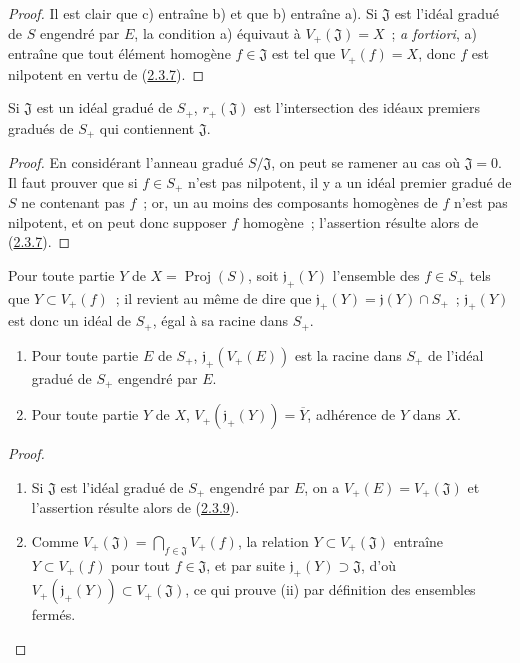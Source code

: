 \begin{proof}
Il est clair que c) entraîne b) et que b) entraîne a). Si $\mathfrak{J}$ est
l'idéal gradué de $S$ engendré par $E$, la condition a) équivaut à
$V_+(\mathfrak{J})=X$~; \emph{a fortiori}, a) entraîne que tout élément
homogène $f\in\mathfrak{J}$ est tel que $V_+(f)=X$, donc $f$ est nilpotent
en vertu de (\hyperref[II.2.3.7-fr]{2.3.7}).
\end{proof}

\begin{corollary}[2.3.9]
\label{II.2.3.9-fr}
Si $\mathfrak{J}$ est un idéal gradué de $S_+$,
$r_+(\mathfrak{J})$ est l'intersection des idéaux premiers gradués de
$S_+$ qui contiennent $\mathfrak{J}$.
\end{corollary}

\begin{proof}
En considérant l'anneau gradué $S/\mathfrak{J}$, on peut se ramener au cas
où $\mathfrak{J}=0$. Il faut prouver que si $f\in S_+$ n'est pas
nilpotent, il y a un idéal premier gradué de $S$ ne contenant pas $f$~; or,
un au moins des composants homogènes de $f$ n'est pas nilpotent, et on peut
donc supposer $f$ homogène~; l'assertion résulte alors de
(\hyperref[II.2.3.7-fr]{2.3.7}).
\end{proof}

\begin{env}[2.3.10]
\label{II.2.3.10-fr}
Pour toute partie $Y$ de $X=\operatorname{Proj}(S)$, soit
$\mathfrak{j}_+(Y)$ l'ensemble des $f\in S_+$ tels que
$Y\subset V_+(f)$~; il revient au même de dire que
$\mathfrak{j}_+(Y)=\mathfrak{j}(Y)\cap S_+$~; $\mathfrak{j}_+(Y)$ est
donc un idéal de $S_+$, égal à sa racine dans $S_+$.
\end{env}

\begin{proposition}[2.3.11]
\label{II.2.3.11-fr}
\begin{enumerate}
  \item[\rm(i)] Pour toute partie $E$ de $S_+$,
    $\mathfrak{j}_+(V_+(E))$ est la racine dans $S_+$ de l'idéal gradué de
    $S_+$ engendré par $E$.
  \item[\rm(ii)] Pour toute partie $Y$ de $X$,
    $V_+(\mathfrak{j}_+(Y))=\overline{Y}$, adhérence de $Y$ dans $X$.
\end{enumerate}
\end{proposition}

\begin{proof}
\begin{enumerate}
  \item[\rm(i)] Si $\mathfrak{J}$ est l'idéal gradué de $S_+$ engendré
    par $E$, on a $V_+(E)=V_+(\mathfrak{J})$ et l'assertion résulte alors de
    (\hyperref[II.2.3.9-fr]{2.3.9}).
  \item[\rm(ii)] Comme
    $V_+(\mathfrak{J})=\bigcap_{f\in\mathfrak{J}}V_+(f)$, la relation
    $Y\subset V_+(\mathfrak{J})$ entraîne $Y\subset V_+(f)$ pour tout
    $f\in\mathfrak{J}$, et par suite
    $\mathfrak{j}_+(Y)\supset\mathfrak{J}$, d'où
    $V_+(\mathfrak{j}_+(Y))\subset V_+(\mathfrak{J})$, ce qui prouve (ii)
    par définition des ensembles fermés.
\end{enumerate}
\end{proof}

